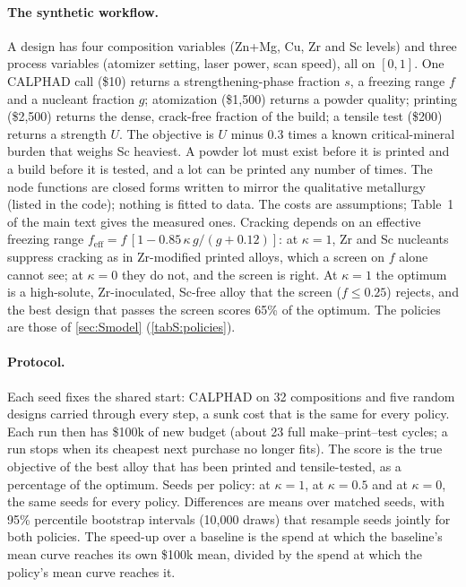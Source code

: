 \documentclass[11pt]{article}
\begin{document}
\paragraph{The synthetic workflow.} A design has four composition variables
(Zn+Mg, Cu, Zr and Sc levels) and three process variables (atomizer setting,
laser power, scan speed), all on $[0,1]$. One CALPHAD call (\$10) returns a
strengthening-phase fraction $s$, a freezing range $f$ and a nucleant fraction
$g$; atomization (\$1,500) returns a powder quality; printing (\$2,500) returns
the dense, crack-free fraction of the build; a tensile test (\$200) returns a
strength $U$. The objective is $U$ minus 0.3 times a known critical-mineral
burden that weighs Sc heaviest.\cite{nassar2020} A powder lot must exist before
it is printed and a build before it is tested, and a lot can be printed any
number of times. The node functions are closed forms written to mirror the
qualitative metallurgy (listed in the code); nothing is fitted to data. The costs
are assumptions; Table~1 of the main text gives the measured ones. Cracking
depends on an effective freezing range
$f_\mathrm{eff}=f\,[1-0.85\,\kappa\,g/(g+0.12)]$: at $\kappa=1$, Zr and Sc
nucleants suppress cracking as in Zr-modified printed
alloys,\cite{martin2017,croteau2018} which a screen on $f$
alone\cite{kou2015} cannot see; at $\kappa=0$ they do not, and the screen is
right. At $\kappa=1$ the optimum is a high-solute, Zr-inoculated, Sc-free alloy
that the screen ($f\le0.25$) rejects, and the best design that passes the screen
scores 65\% of the optimum. The policies are those of \cref{sec:Smodel}
(\cref{tabS:policies}).

\paragraph{Protocol.} Each seed fixes the shared start: CALPHAD on 32
compositions and five random designs carried through every step, a sunk cost
that is the same for every policy. Each run then has \$100k of new budget
(about 23 full make--print--test cycles; a run stops when its cheapest next
purchase no longer fits). The score is the true objective of the best alloy that
has been printed and tensile-tested, as a percentage of the optimum. Seeds per
policy:  at $\kappa=1$,  at $\kappa=0.5$ and
 at $\kappa=0$, the same seeds for every policy. Differences are
means over matched seeds, with 95\% percentile bootstrap intervals (10,000
draws) that resample seeds jointly for both policies.\cite{efron1993} The
speed-up over a baseline is the spend at which the baseline's mean curve reaches
its own \$100k mean, divided by the spend at which the policy's mean curve
reaches it.
\end{document}
